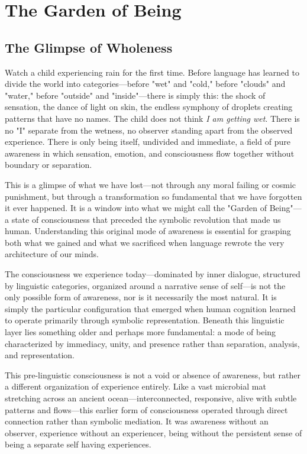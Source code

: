 \chapter{The Garden of Being}

\section{The Glimpse of Wholeness}

Watch a child experiencing rain for the first time. Before language has learned to divide the world into categories—before "wet" and "cold," before "clouds" and "water," before "outside" and "inside"—there is simply this: the shock of sensation, the dance of light on skin, the endless symphony of droplets creating patterns that have no names. The child does not think \textit{I am getting wet}. There is no "I" separate from the wetness, no observer standing apart from the observed experience. There is only being itself, undivided and immediate, a field of pure awareness in which sensation, emotion, and consciousness flow together without boundary or separation.

This is a glimpse of what we have lost—not through any moral failing or cosmic punishment, but through a transformation so fundamental that we have forgotten it ever happened. It is a window into what we might call the "Garden of Being"—a state of consciousness that preceded the symbolic revolution that made us human. Understanding this original mode of awareness is essential for grasping both what we gained and what we sacrificed when language rewrote the very architecture of our minds.

The consciousness we experience today—dominated by inner dialogue, structured by linguistic categories, organized around a narrative sense of self—is not the only possible form of awareness, nor is it necessarily the most natural. It is simply the particular configuration that emerged when human cognition learned to operate primarily through symbolic representation. Beneath this linguistic layer lies something older and perhaps more fundamental: a mode of being characterized by immediacy, unity, and presence rather than separation, analysis, and representation.

This pre-linguistic consciousness is not a void or absence of awareness, but rather a different organization of experience entirely. Like a vast microbial mat stretching across an ancient ocean—interconnected, responsive, alive with subtle patterns and flows—this earlier form of consciousness operated through direct connection rather than symbolic mediation. It was awareness without an observer, experience without an experiencer, being without the persistent sense of being a separate self having experiences.

